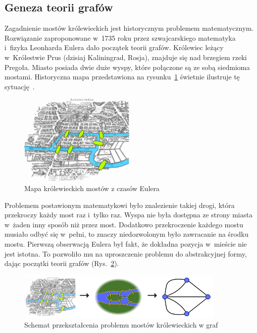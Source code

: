 \documentclass[twoside,12pt]{report}
\begin{document}
\subsection{Geneza teorii grafów}
Zagadnienie mostów królewieckich jest historycznym problemem matematycznym. Rozwiązanie zaproponowane w~1735 roku przez szwajcarskiego matematyka i~fizyka Leonharda Eulera dało początek teorii grafów. Królewiec leżący w~Królestwie Prus (dzisiaj Kaliningrad, Rosja), znajduje się nad brzegiem rzeki Pregoła. Miasto posiada dwie duże wyspy, które połączone są ze sobą siedmioma mostami. Historyczna mapa przedstawiona na rysunku~\ref{fig:mapa_krolewiec} świetnie ilustruje tę sytuację~\cite{teoria-grafow}.

\begin{figure}[htbp]
	\centering
	\includegraphics[width=0.50\textwidth]{img/konigsberg_bridges}
	\caption{Mapa królewieckich mostów z czasów Eulera} 
	\label{fig:mapa_krolewiec}
\end{figure}

Problemem postawionym matematykowi było znalezienie takiej drogi, która przekroczy każdy most raz i~tylko raz. Wyspa nie była dostępna ze strony miasta w~żaden inny sposób niż przez most. Dodatkowo przekroczenie każdego mostu musiało odbyć się w~pełni, to znaczy niedozwolonym było zawracanie na środku mostu. Pierwszą obserwacją Eulera był fakt, że dokładna pozycja w~mieście nie jest istotna. To pozwoliło mu na uproszczenie problemu do abstrakcyjnej formy, dając początki teorii grafów (Rys.~\ref{fig:krolewiec_simple}).

\begin{figure}[htbp]
	\centering
	\includegraphics[width=0.90\textwidth]{img/bridge_uproszczenie}
	\caption{Schemat przekształcenia problemu mostów królewieckich w graf} 
	\label{fig:krolewiec_simple}
\end{figure}
\end{document}
